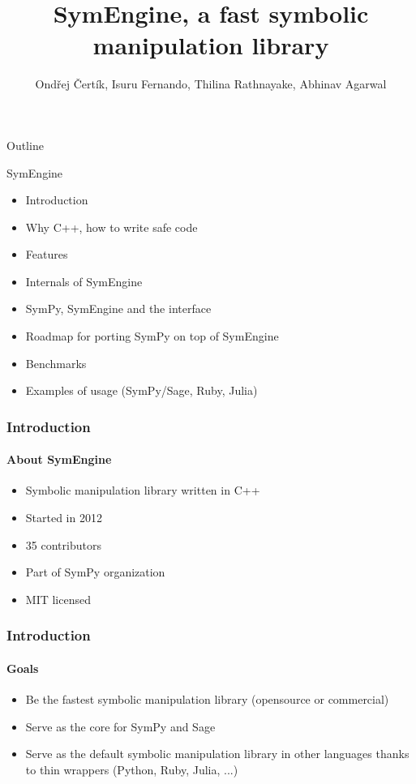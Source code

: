 \documentclass{beamer}
\title[SymEngine \hspace{14em}\insertframenumber/
\inserttotalframenumber]{SymEngine, a fast symbolic manipulation library}
\author[O. Čertík, I. Fernando, ...]{Ondřej Čertík, Isuru Fernando, Thilina Rathnayake, Abhinav Agarwal}
\begin{document}
\begin{frame}
\maketitle
\end{frame}


\begin{frame}{Outline}
\begin{block}{SymEngine}
\begin{itemize}
\item Introduction
\item Why C++, how to write safe code
\item Features
\item Internals of SymEngine
\item SymPy, SymEngine and the interface
\item Roadmap for porting SymPy on top of SymEngine
\item Benchmarks
\item Examples of usage (SymPy/Sage, Ruby, Julia)
\end{itemize}
\end{block}
\end{frame}


\begin{frame}
\frametitle{Introduction}
\framesubtitle{About SymEngine}
\begin{itemize}
\item Symbolic manipulation library written in C++
\item Started in 2012
\item 35 contributors
\item Part of SymPy organization
\item MIT licensed
\end{itemize}
\end{frame}


\begin{frame}
\frametitle{Introduction}
\framesubtitle{Goals}
\begin{itemize}
\item Be the fastest symbolic manipulation library (opensource or commercial)
\item Serve as the core for SymPy and Sage
\item Serve as the default symbolic manipulation library in other languages
    thanks to thin wrappers (Python, Ruby, Julia, ...)
\end{itemize}
\end{frame}
\end{document}
